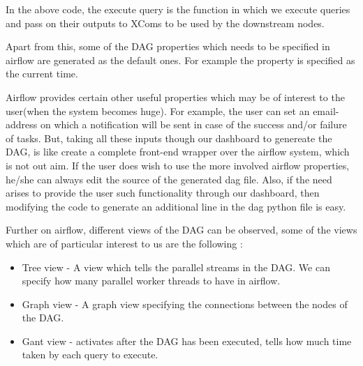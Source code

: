\documentclass[letterpaper,10pt,english]{sphinxmanual}
\begin{document}
In the above code, the execute query is the function in which we execute queries and pass on their outputs to XComs to be used by the downstream nodes.

\begin{sphinxVerbatim}[commandchars=\\\{\}]
\PYG{p}{[}\PYG{p}{]}
\PYG{p}{[}\PYG{p}{]}\PYG{p}{[}\PYG{p}{]}  
\end{sphinxVerbatim}

Apart from this, some of the DAG properties which needs to be specified in airflow are generated as the default ones. For example the  property is specified as the current time.

Airflow provides certain other useful properties which may be of interest to the user(when the system becomes huge). For example, the user can set an email-address on which a notification will be sent in case of the success and/or failure of tasks. But, taking all these inputs though our dashboard to genereate the DAG, is like create a complete front-end wrapper over the airflow system, which is not out aim. If the user does wish to use the more involved airflow properties, he/she can always edit the source of the generated dag file. Also, if the need arises to provide the user such functionality through our dashboard, then modifying the code to generate an additional line in the dag python file is easy.

Further on airflow, different views of the DAG can be observed, some of the views which are of particular interest to us are the following :
\begin{itemize}
\item {} 
Tree view - A view which tells the parallel streams in the DAG. We can specify how many parallel worker threads to have in airflow.

\item {} 
Graph view - A graph view specifying the connections between the nodes of the DAG.

\item {} 
Gant view - activates after the DAG has been executed, tells how much time taken by each query to execute.

\end{itemize}
\end{document}
